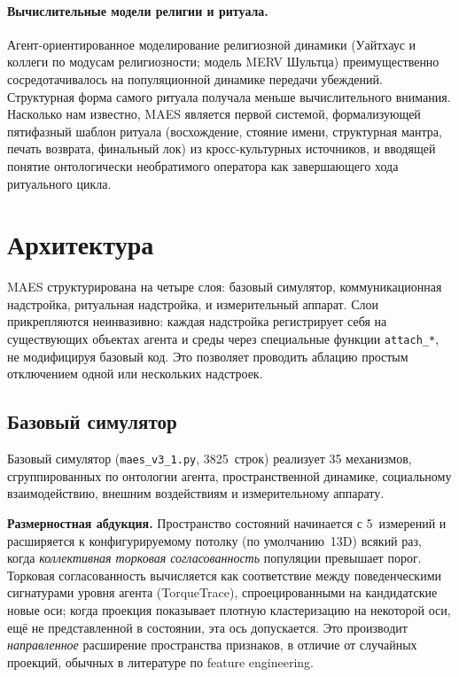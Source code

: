 \documentclass[11pt,a4paper]{article}
\begin{document}
\paragraph{Вычислительные модели религии и ритуала.}
Агент-ориентированное моделирование религиозной динамики (Уайтхаус и
коллеги по модусам религиозности; модель MERV Шультца) преимущественно
сосредотачивалось на популяционной динамике передачи убеждений.
Структурная форма самого ритуала получала меньше вычислительного
внимания. Насколько нам известно, MAES является первой системой,
формализующей пятифазный шаблон ритуала (восхождение, стояние имени,
структурная мантра, печать возврата, финальный лок) из кросс-культурных
источников, и вводящей понятие онтологически необратимого оператора как
завершающего хода ритуального цикла.

\section{Архитектура}
\label{sec:arch}

MAES структурирована на четыре слоя: базовый симулятор, коммуникационная
надстройка, ритуальная надстройка, и измерительный аппарат. Слои
прикрепляются неинвазивно: каждая надстройка регистрирует себя на
существующих объектах агента и среды через специальные функции
\texttt{attach\_*}, не модифицируя базовый код. Это позволяет проводить
аблацию простым отключением одной или нескольких надстроек.

\subsection{Базовый симулятор}

Базовый симулятор (\texttt{maes\_v3\_1.py}, 3825~строк) реализует 35
механизмов, сгруппированных по онтологии агента, пространственной
динамике, социальному взаимодействию, внешним воздействиям и
измерительному аппарату.

\textbf{Размерностная абдукция.} Пространство состояний начинается с
5~измерений и расширяется к конфигурируемому потолку (по умолчанию~13D)
всякий раз, когда \emph{коллективная торковая согласованность} популяции
превышает порог. Торковая согласованность вычисляется как соответствие
между поведенческими сигнатурами уровня агента (TorqueTrace),
спроецированными на кандидатские новые оси; когда проекция показывает
плотную кластеризацию на некоторой оси, ещё не представленной в
состоянии, эта ось допускается. Это производит \emph{направленное}
расширение пространства признаков, в отличие от случайных проекций,
обычных в литературе по feature engineering.
\end{document}
